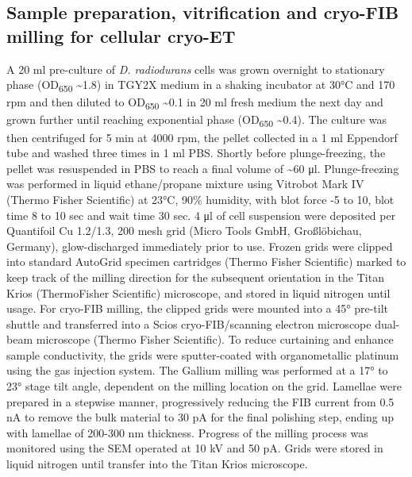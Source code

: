 \subsection[Sample preparation for Cryo-ET]{Sample preparation, vitrification and cryo-FIB milling for cellular cryo-ET}\label{drad_lamellae_method}
A 20 ml pre-culture of \textit{D. radiodurans} cells was grown overnight to stationary phase (OD\textsubscript{650} \sim1.8) in TGY2X medium in a shaking incubator at 30°C and 170 rpm and then diluted to OD\textsubscript{650} \sim0.1 in 20 ml fresh medium the next day and grown further until reaching exponential phase (OD\textsubscript{650} \sim0.4).
The culture was then centrifuged for 5 min at 4000 rpm, the pellet collected in a 1 ml Eppendorf tube and washed three times in 1 ml PBS.
Shortly before plunge-freezing, the pellet was resuspended in PBS to reach a final volume of \sim60 μl.
Plunge-freezing was performed in liquid ethane/propane mixture using Vitrobot Mark IV (Thermo Fisher Scientific) at 23°C, 90\% humidity, with blot force -5 to 10, blot time 8 to 10 sec and wait time 30 sec.
4 μl of cell suspension were deposited per Quantifoil Cu 1.2/1.3, 200 mesh grid (Micro Tools GmbH, Großlöbichau, Germany), glow-discharged immediately prior to use.
Frozen grids were clipped into standard AutoGrid specimen cartridges (Thermo Fisher Scientific) marked to keep track of the milling direction for the subsequent orientation in the Titan Krios (ThermoFisher Scientific) microscope, and stored in liquid nitrogen until usage.
For cryo-FIB milling, the clipped grids were mounted into a 45° pre-tilt shuttle and transferred into a Scios cryo-FIB/scanning electron microscope dual-beam microscope (Thermo Fisher Scientific).
To reduce curtaining and enhance sample conductivity, the grids were sputter-coated with organometallic platinum using the gas injection system.
The Gallium milling was performed at a 17° to 23° stage tilt angle, dependent on the milling location on the grid.
Lamellae were prepared in a stepwise manner, progressively reducing the FIB current from 0.5 nA to remove the bulk material to 30 pA for the final polishing step, ending up with lamellae of 200-300 nm thickness.
Progress of the milling process was monitored using the SEM operated at 10 kV and 50 pA.
Grids were stored in liquid nitrogen until transfer into the Titan Krios microscope.

